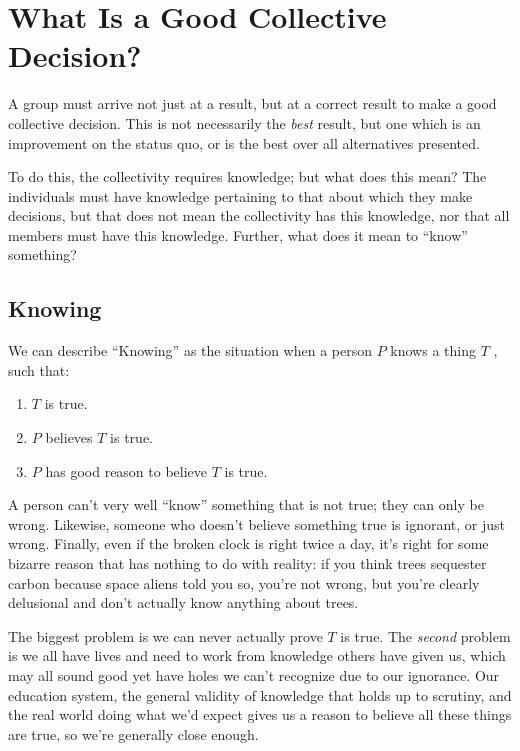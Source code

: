 \chapter{What Is a Good Collective Decision?}
\label {apx:on-knowledge}

A group must arrive not just at a result, but at a correct result to make a good collective decision.  This is not necessarily the \textit{best} result, but one which is an improvement on the status quo, or is the best over all alternatives presented.

To do this, the collectivity requires knowledge; but what does this mean?  The individuals must have knowledge pertaining to that about which they make decisions, but that does not mean the collectivity has this knowledge, nor that all members must have this knowledge.  Further, what does it mean to ``know'' something?

\section{Knowing}

We can describe ``Knowing'' as the situation when a person $\mathit{P}$ knows a thing $\mathit{T}$ \autocites[57]{Tideman2006}{Nozick1983}, such that:

\begin{enumerate}
    \item $\mathit{T}$ is true.
    \item $\mathit{P}$ believes $\mathit{T}$ is true.
    \item $\mathit{P}$ has good reason to believe $\mathit{T}$ is true.
\end{enumerate}

A person can't very well ``know'' something that is not true; they can only be wrong.  Likewise, someone who doesn't believe something true is ignorant, or just wrong.  Finally, even if the broken clock is right twice a day, it's right for some bizarre reason that has nothing to do with reality:  if you think trees sequester carbon because space aliens told you so, you're not wrong, but you're clearly delusional and don't actually know anything about trees.

The biggest problem is we can never actually prove $\mathit{T}$ is true.  The \textit{second} problem is we all have lives and need to work from knowledge others have given us, which may all sound good yet have holes we can't recognize due to our ignorance.  Our education system, the general validity of knowledge that holds up to scrutiny, and the real world doing what we'd expect gives us a reason to believe all these things are true, so we're generally close enough.

